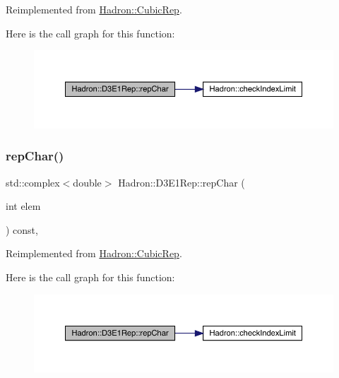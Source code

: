 Reimplemented from \mbox{\hyperlink{structHadron_1_1CubicRep_af45227106e8e715e84b0af69cd3b36f8}{Hadron\+::\+Cubic\+Rep}}.

Here is the call graph for this function\+:
\nopagebreak
\begin{figure}[H]
\begin{center}
\leavevmode
\includegraphics[width=350pt]{d3/daf/structHadron_1_1D3E1Rep_a67caadd543a2e693c1be006d8e11742c_cgraph}
\end{center}
\end{figure}
\mbox{\label{structHadron_1_1D3E1Rep_a67caadd543a2e693c1be006d8e11742c}} 
\subsubsection{\texorpdfstring{repChar()}{repChar()}\hspace{0.1cm}{\footnotesize\ttfamily [3/3]}}
{\footnotesize\ttfamily std\+::complex$<$double$>$ Hadron\+::\+D3\+E1\+Rep\+::rep\+Char (\begin{DoxyParamCaption}\item[{int}]{elem }\end{DoxyParamCaption}) const\hspace{0.3cm}{\ttfamily [inline]}, {\ttfamily [virtual]}}



Reimplemented from \mbox{\hyperlink{structHadron_1_1CubicRep_af45227106e8e715e84b0af69cd3b36f8}{Hadron\+::\+Cubic\+Rep}}.

Here is the call graph for this function\+:
\nopagebreak
\begin{figure}[H]
\begin{center}
\leavevmode
\includegraphics[width=350pt]{d3/daf/structHadron_1_1D3E1Rep_a67caadd543a2e693c1be006d8e11742c_cgraph}
\end{center}
\end{figure}
\mbox{\label{structHadron_1_1D3E1Rep_ac66aebdefbd99d129891c85cbc86b430}} 
